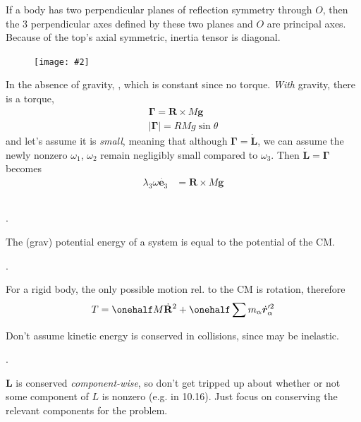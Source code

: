 \documentclass[10pt, twocolumn]{article}
\newcommand\myfig[2][0.3\textwidth]{\begin{figure}[h!]\centering\texttt{[image: \#2]}\end{figure}}
\newcommand{\myspace}{\vspace{3\bigskipamount}}
\newcommand\p{\Needspace{10\baselineskip} \noindent}
\begin{document}
\p {} If a body has two perpendicular planes of reflection symmetry through $O$, then the 3 perpendicular axes defined by these two planes and $O$ are principal axes. Because of the top's axial symmetric, inertia tensor is diagonal. 


\myfig[0.25\textwidth]{SpinningTop.PNG}

\p In the absence of gravity, , which is constant since no torque. \textit{With} gravity, there is a torque, 
\begin{align}
\bm\Gamma = \mathbf{R}\times M\bm{g} \\ 
| \bm\Gamma | = RMg\sin\theta
\end{align}
and let's assume it is \textit{small}, meaning that although $\bm\Gamma=\dot{\mathbf{L}}$, we can assume the newly nonzero $\omega_1$, $\omega_2$ remain negligibly small compared to $\omega_3$. Then  $\dot{\mathbf{L}}=\bm\Gamma$ becomes
\begin{align}
	\lambda_3 \omega \dot{\bm{e}_3} &=  \mathbf{R}\times M\bm{g}
\end{align}

\myspace
\subsection{}

\p {}. 
\begin{compactitem}
	\item The (grav) potential energy of a system is equal to the potential of the CM. 
\end{compactitem}

\myspace
\p {}. 
\begin{compactitem}
	\item For a rigid body, the only possible motion rel. to the CM is rotation, therefore
	\begin{align}
		T = \onehalf M \dot{\mathbf R}^2 + \onehalf \sum m_\alpha \dot{\bm r}_\alpha^{\prime 2}
	\end{align}
	
	\item Don't assume kinetic energy is conserved in collisions, since may be inelastic. 
\end{compactitem}

\myspace
\p {}. 
\begin{compactitem}
	\item $\mathbf L$ is conserved \textit{component-wise}, so don't get tripped up about whether or not some component of $L$ is nonzero (e.g. in 10.16). Just focus on conserving the relevant components for the problem. 
\end{compactitem}
\end{document}
